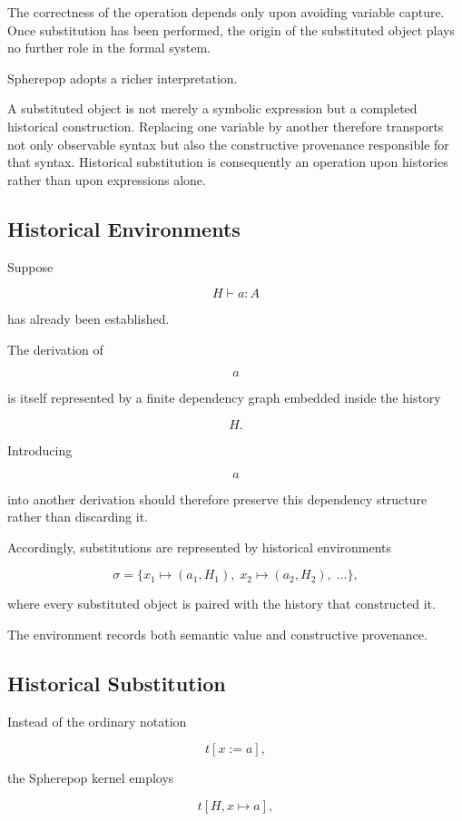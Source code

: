 \documentclass[12pt,oneside]{article}
\theoremstyle{definition}
\theoremstyle{remark}
\begin{document}
The correctness of the operation depends only upon avoiding variable capture.
Once substitution has been performed, the origin of the substituted object plays
no further role in the formal system.

Spherepop adopts a richer interpretation.

A substituted object is not merely a symbolic expression but a completed
historical construction. Replacing one variable by another therefore transports
not only observable syntax but also the constructive provenance responsible for
that syntax. Historical substitution is consequently an operation upon histories
rather than upon expressions alone.

\subsection{Historical Environments}

Suppose

\[
H
\vdash
a:A
\]

has already been established.

The derivation of

\[
a
\]

is itself represented by a finite dependency graph embedded inside the history

\[
H.
\]

Introducing

\[
a
\]

into another derivation should therefore preserve this dependency structure
rather than discarding it.

Accordingly, substitutions are represented by historical environments

\[
\sigma
=
\{
x_1 \mapsto (a_1,H_1),
\;
x_2 \mapsto (a_2,H_2),
\;
\ldots
\},
\]

where every substituted object is paired with the history that constructed it.

The environment records both semantic value and constructive provenance.

\subsection{Historical Substitution}

Instead of the ordinary notation

\[
t[x:=a],
\]

the Spherepop kernel employs

\[
t[H,x\mapsto a],
\]
\end{document}
